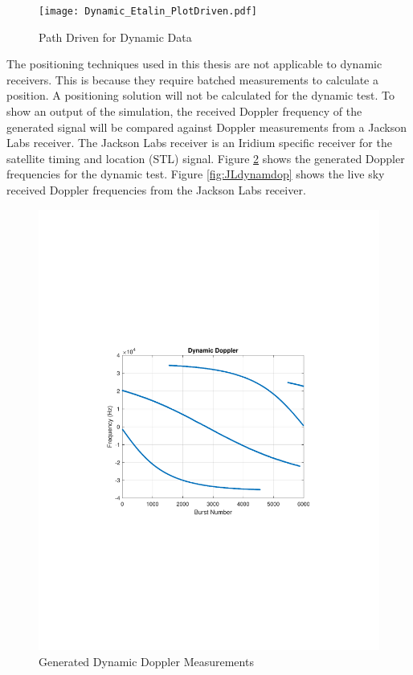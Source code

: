 \documentclass[12pt]{report}
\begin{document}
\begin{figure}[h!]
    \centering
    \texttt{[image: Dynamic\_Etalin\_PlotDriven.pdf]}
    \caption{Path Driven for Dynamic Data}
    \label{fig:Dynamicpath}
\end{figure}

The positioning techniques used in this thesis are not applicable to dynamic receivers. This is because they require batched measurements to calculate a position. A positioning solution will not be calculated for the dynamic test. To show an output of the simulation, the received Doppler frequency of the generated signal will be compared against Doppler measurements from a Jackson Labs receiver. The Jackson Labs receiver is an Iridium specific receiver for the satellite timing and location (STL) signal. Figure \ref{fig:gendynamdop} shows the generated Doppler frequencies for the dynamic test. Figure \ref{fig:JLdynamdop} shows the live sky received Doppler frequencies from the Jackson Labs receiver.

\begin{figure}[h!]
    \centering
    \includegraphics[trim=1.2in 3.3in 1.75in 3.3in,clip,width=5in]
    {Dynamic_Irid_Doppler-2.pdf}
    \caption{Generated Dynamic Doppler Measurements}
    \label{fig:gendynamdop}
\end{figure}
\end{document}

